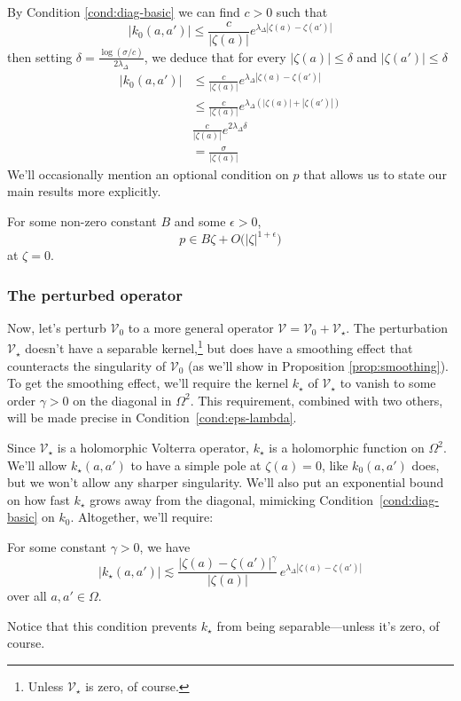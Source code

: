 \documentclass{article}
\makeatletter
\theoremstyle{plain}
\newcommand{\condconst}[2]{\item[($\text{\textsc{#1}} \mid #2$)]\protected@edef\@currentlabel{$\text{\textsc{#1}} \mid #2$}}
\newcommand{\volterra}{\mathcal{V}}
\newcommand{\hardpart}{\mathcal{V}_0}
\newcommand{\softpart}{\mathcal{V}_\star}
\newcommand{\hardker}{k_0}
\newcommand{\softker}{k_\star}
\newcommand{\domain}{\Omega}
\newenvironment{verify}{\color{ForestGreen}}{\color{black}}
\makeatother
\begin{document}
\begin{verify}
    By Condition \eqref{cond:diag-basic} we can find $c>0$ such that \[ | \hardker(a, a') | \le \frac{c}{|\zeta(a)|} e^{\lambda_\Delta|\zeta(a)-\zeta(a')|} \]
then setting $\delta=\frac{\log(\sigma/c)}{2\lambda_\Delta}$, we deduce that for every $|\zeta(a)|\le\delta$ and  $|\zeta(a')|\le\delta$
\begin{align*}
    |\hardker(a,a')|&\le \frac{c}{|\zeta(a)|} e^{\lambda_\Delta|\zeta(a)-\zeta(a')|}\\
    &\le \frac{c}{|\zeta(a)|} e^{\lambda_\Delta(|\zeta(a)|+|\zeta(a')|)}\\
    &\frac{c}{|\zeta(a)|} e^{2\lambda_\Delta \delta}\\
    &=\frac{\sigma}{|\zeta(a)|}
\end{align*}
\end{verify}
\color{black}
We'll occasionally mention an optional condition on $p$ that allows us to state our main results more explicitly.
\begin{conditions}
\condconst{reg-p}{B, \epsilon}\label{cond:reg-p}
For some non-zero constant $B$ and some $\epsilon > 0$,
\[ p \in B\zeta + O\big(|\zeta|^{1 + \epsilon}\big) \]
at $\zeta = 0$.
\end{conditions}
\subsubsection{The perturbed operator}\label{setting:perturbed}

Now, let's perturb $\hardpart$ to a more general operator $\volterra=\hardpart +\softpart$. The perturbation $\softpart$ doesn't have a separable kernel,\footnote{Unless $\softpart$ is zero, of course.} but does have a smoothing effect that counteracts the singularity of $\hardpart$ (as we'll show in Proposition \ref{prop:smoothing}). To get the smoothing effect, we'll require the kernel $\softker$ of $\softpart$ to vanish to some order $\gamma > 0$ on the diagonal in $\domain^2$. This requirement, combined with two others, will be made precise in Condition~\eqref{cond:eps-lambda}.

Since $\softpart$ is a holomorphic Volterra operator, $\softker$ is a holomorphic function on $\domain^2$. We'll allow $\softker(a, a')$ to have a simple pole at $\zeta(a) = 0$, like $\hardker(a, a')$ does, but we won't allow any sharper singularity. We'll also put an exponential bound on how fast $\softker$ grows away from the diagonal, mimicking Condition~\eqref{cond:diag-basic} on $\hardker$. Altogether, we'll require:
\begin{conditions}
\condconst{diag$_\star$}{\gamma, \lambda_\Delta}\label{cond:eps-lambda} For some constant $\gamma > 0$, we have
\[ |\softker(a, a')| \lesssim\frac{|\zeta(a)-\zeta(a')|^\gamma}{|\zeta(a)|}\,e^{\lambda_\Delta|\zeta(a)-\zeta(a')|}\]
over all $a, a' \in \domain$.
\end{conditions}
Notice that this condition prevents $\softker$ from being separable---unless it's zero, of course.
\end{document}
